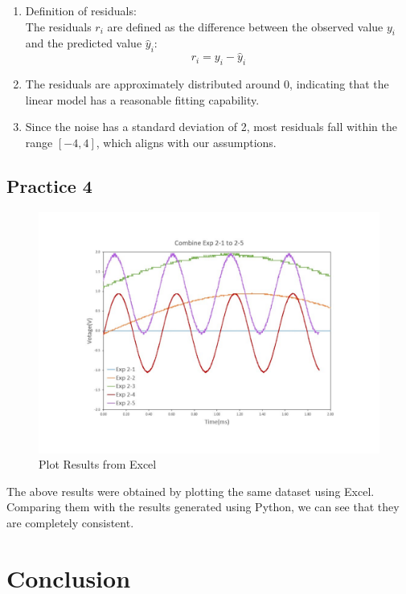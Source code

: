 \documentclass[12pt,a4paper]{article}
\begin{document}
\begin{CJK}{UTF8}{bkai}
\begin{enumerate}
    \item Definition of residuals:\\
    The residuals $r_i$ are defined as the difference between the observed value $y_i$ and the predicted value $\hat{y}_i$:
    \begin{equation}
        r_i=y_i-\hat{y}_i
    \end{equation}
    \item The residuals are approximately distributed around 0, indicating that the linear model has a reasonable fitting capability.
    \item Since the noise has a standard deviation of 2, most residuals fall within the range $[-4,4]$, which aligns with our assumptions.
\end{enumerate}

\subsection{Practice 4}
\begin{figure}[h]
    \centering
    \includegraphics[width=1\linewidth]{figures/Aasfasdsd.pdf}
    \caption{Plot Results from Excel}
    \label{fig:excel}
\end{figure}

The above results were obtained by plotting the same dataset using Excel. Comparing them with the results generated using Python, we can see that they are completely consistent.


\clearpage
\section{Conclusion}\label{sec:conclusion}
\hfill


\end{CJK}
\end{document}
